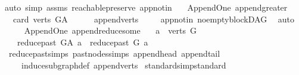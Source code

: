 \begin{isabellebody}
\isamarkupfalse%
{\isacharparenleft}{\kern0pt}auto\ simp{\isacharcolon}{\kern0pt}\ assms\ reachable{}{\isacharunderscore}{\kern0pt}preserve\ app{\isacharunderscore}{\kern0pt}notin{\isacharparenright}{\kern0pt}\ \isamarkupfalse%
%
\endisatagproof
{\isafoldproof}%
%
\isadelimproof
\isanewline
%
\endisadelimproof
\isanewline
{}\isamarkupfalse%
\ {\isacharparenleft}{\kern0pt}\ Append{\isacharunderscore}{\kern0pt}One{\isacharparenright}{\kern0pt}\ append{\isacharunderscore}{\kern0pt}greater{\isacharunderscore}{\kern0pt}{}{\isacharcolon}{\kern0pt}\isanewline
\ \ {\isachardoublequoteopen}card\ {\isacharparenleft}{\kern0pt}verts\ G{\isacharunderscore}{\kern0pt}A{\isacharparenright}{\kern0pt}\ {\isachargreater}{\kern0pt}\ {}{\isachardoublequoteclose}\isanewline
%
\isadelimproof
\ \ %
\endisadelimproof
%
\isatagproof
{}\isamarkupfalse%
\ append{\isacharunderscore}{\kern0pt}verts\ \isanewline
\ \ \isamarkupfalse%
\ app{\isacharunderscore}{\kern0pt}notin\ no{\isacharunderscore}{\kern0pt}empty{\isacharunderscore}{\kern0pt}blockDAG\ \isamarkupfalse%
\ auto%
\endisatagproof
{\isafoldproof}%
%
\isadelimproof
\ \ \isanewline
%
\endisadelimproof
\isanewline
{}\isamarkupfalse%
\ {\isacharparenleft}{\kern0pt}\ Append{\isacharunderscore}{\kern0pt}One{\isacharparenright}{\kern0pt}\ append{\isacharunderscore}{\kern0pt}reduce{\isacharunderscore}{\kern0pt}some{\isacharcolon}{\kern0pt}\isanewline
\ \ \ {\isachardoublequoteopen}a\ {\isasymin}\ verts\ G{\isachardoublequoteclose}\isanewline
\ \ \ {\isachardoublequoteopen}reduce{\isacharunderscore}{\kern0pt}past\ G{\isacharunderscore}{\kern0pt}A\ a\ {\isacharequal}{\kern0pt}\ reduce{\isacharunderscore}{\kern0pt}past\ G\ a{\isachardoublequoteclose}\isanewline
%
\isadelimproof
\ \ %
\endisadelimproof
%
\isatagproof
{}\isamarkupfalse%
\ reduce{\isacharunderscore}{\kern0pt}past{\isachardot}{\kern0pt}simps\ past{\isacharunderscore}{\kern0pt}nodes{\isachardot}{\kern0pt}simps\ append{\isacharunderscore}{\kern0pt}head\ append{\isacharunderscore}{\kern0pt}tail\ \isanewline
\ \ \ \ induce{\isacharunderscore}{\kern0pt}subgraph{\isacharunderscore}{\kern0pt}def\ append{\isacharunderscore}{\kern0pt}verts\ \isanewline
{}\isamarkupfalse%
{\isacharparenleft}{\kern0pt}standard{\isacharcomma}{\kern0pt}simp{\isacharcomma}{\kern0pt}standard{\isacharparenright}{\kern0pt}\isanewline
\ \ \isamarkupfalse%

\end{isabellebody}
